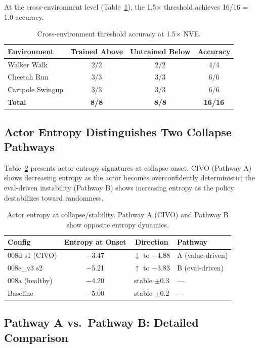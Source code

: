 \documentclass[10pt,letterpaper]{article}
\begin{document}
At the cross-environment level (Table~\ref{tab:cross_threshold}), the 1.5$\times$ threshold achieves 16/16 = 1.0 accuracy.

\begin{table}[h]
\centering
\caption{Cross-environment threshold accuracy at 1.5$\times$ NVE.}
\label{tab:cross_threshold}
\begin{tabular}{lccc}
\toprule
\textbf{Environment} & \textbf{Trained Above} & \textbf{Untrained Below} & \textbf{Accuracy} \\
\midrule
Walker Walk & 2/2 & 2/2 & 4/4 \\
Cheetah Run & 3/3 & 3/3 & 6/6 \\
Cartpole Swingup & 3/3 & 3/3 & 6/6 \\
\midrule
\textbf{Total} & \textbf{8/8} & \textbf{8/8} & \textbf{16/16} \\
\bottomrule
\end{tabular}
\end{table}

\subsection{Actor Entropy Distinguishes Two Collapse Pathways}

Table~\ref{tab:entropy} presents actor entropy signatures at collapse onset.
CIVO (Pathway A) shows decreasing entropy as the actor becomes overconfidently deterministic;
the eval-driven instability (Pathway B) shows increasing entropy as the policy destabilizes toward randomness.

\begin{table}[h]
\centering
\caption{Actor entropy at collapse/stability. Pathway A (CIVO) and Pathway B show opposite entropy dynamics.}
\label{tab:entropy}
\begin{tabular}{lccl}
\toprule
\textbf{Config} & \textbf{Entropy at Onset} & \textbf{Direction} & \textbf{Pathway} \\
\midrule
008d s1 (CIVO) & $-$3.47 & $\downarrow$ to $-$4.88 & A (value-driven) \\
008e\_v3 s2 & $-$5.21 & $\uparrow$ to $-$3.83 & B (eval-driven) \\
008a (healthy) & $-$4.20 & stable $\pm$0.3 & --- \\
Baseline & $-$5.00 & stable $\pm$0.2 & --- \\
\bottomrule
\end{tabular}
\end{table}

\subsection{Pathway A vs.\ Pathway B: Detailed Comparison}
\end{document}
